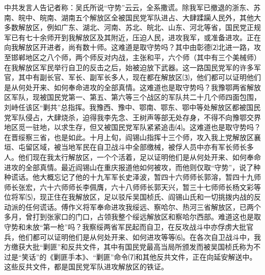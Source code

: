 \documentclass[UTF-8, a5paper, 12pt]{ctexart}
\begin{document}
中共发言人告记者称：吴氏所说“守势”云云，全系撒谎。除我军已撤退的浙东、苏南、皖中、皖南、湖南五个解放区全被国民党军队进占、大肆蹂躏人民外，其他大多数解放区，例如广东、湖北、河南、苏北、皖北、山东、河北等省，国民党正规军已有七十余师开到我解放区及其附近，压迫人民，进攻我军，或准备进攻。正在向我解放区开进者，尚有数十师。这难道是取守势吗？其中由彰德⑵北进一路，攻至邯郸地区之八个师，两个师反对内战，主张和平，六个师（其中有三个美械师）在我解放区军民举行自卫的反击之后，始被迫放下武器。这一路国民党军的许多军官，其中有副长官、军长、副军长多人，现在都在解放区⑶，他们都可以证明他们是从何处开来、如何奉命进攻的全部真情。这难道也是取守势吗？我豫鄂两省解放区军队，现被国民党第一、第五、第六等三个战区的军队共二十几个师四面包围，刘峙任该区“剿共”总指挥。我豫西、豫中、鄂南、鄂东、鄂中等处解放区都被国民党军队侵占，大肆烧杀，迫得我李先念、王树声等部无处存身，不得不向豫鄂交界地区觅一驻地，以求生存，但又被国民党军队紧紧追击⑷。这难道也是取守势吗？在晋绥察三省，也是如此。十月上旬，阎锡山指挥十三个师，攻入我上党解放区襄垣、屯留区域，被当地军民在自卫战斗中全部缴械，被俘人员中亦有军长师长多人。他们现在我太行解放区，一个个活着，足以证明他们是从何处开来、如何奉命进攻的全部真情。最近阎锡山在重庆报道他如何被攻，而他则仅取“守势”，说了种种谎话。他大概忘记了他的十九军军长史泽波，暂四十六师师长郭溶，暂四十九师师长张宏，六十六师师长李佩膺，六十八师师长郭天兴，暂三十七师师长杨文彩等位将军⑸，现正住在我解放区，足以驳斥吴国桢氏、阎锡山氏和一切挑拨内战的反动派的任何谎话。傅作义将军奉命进攻我绥远、察哈尔、热河三省解放区，已两个多月，曾打到张家口的门口，占领我整个绥远解放区和察哈尔西部。难道这也是取守势和未放“第一枪”吗？我察绥两省军民起而自卫，在反攻战斗中亦俘虏大批官兵，他们都可以证明他们是从何处开来、如何进攻等等⑹。在各次自卫战斗中，我方缴获大批“剿匪”和反共文件，其中有国民党最高当局所颁发而被吴国桢氏称为不过是“笑话”的《剿匪手本》、“剿匪”命令⑺和其他反共文件，正在向延安解送中。这些反共文件，都是国民党军队进攻解放区的铁证。
\end{document}
